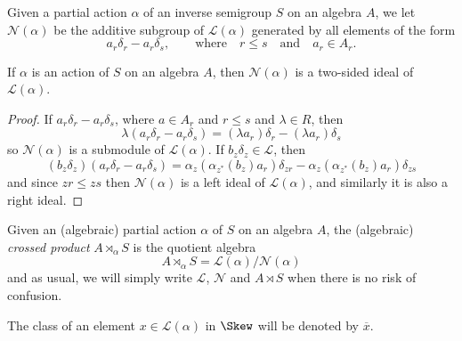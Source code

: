 \begin{definition}\label{definitionNalpha}
Given a partial action $\alpha$ of an inverse semigroup $S$ on an algebra $A$, we let $\mathscr{N}(\alpha)$ be the additive subgroup of $\mathscr{L}(\alpha)$ generated by all elements of the form
\[a_r\delta_r - a_r\delta_s,\qquad\text{where}\quad r\leq s\quad\text{and}\quad a_r\in A_r.\] 
\end{definition}

\begin{proposition}
If $\alpha$ is an action of $S$ on an algebra $A$, then $\mathscr{N}(\alpha)$ is a two-sided ideal of $\mathscr{L}(\alpha)$.
\end{proposition}
\begin{proof}
If $a_r\delta_r-a_r\delta_s$, where $a\in A_r$ and $r\leq s$ and $\lambda\in R$, then
\[\lambda(a_r\delta_r-a_r\delta_s)=(\lambda a_r)\delta_r-(\lambda a_r)\delta_s\]
so $\mathscr{N}(\alpha)$ is a submodule of $\mathscr{L}(\alpha)$. If $b_z\delta_z\in\mathscr{L}$, then
\[(b_z\delta_z)(a_r\delta_r-a_r\delta_s)=\alpha_z(\alpha_{z^*}(b_z)a_r)\delta_{zr}-\alpha_z(\alpha_{z^*}(b_z)a_r)\delta_{zs}\]
and since $zr\leq zs$ then $\mathscr{N}(\alpha)$ is a left ideal of $\mathscr{L}(\alpha)$, and similarly it is also a right ideal.\qedhere
\end{proof}

\begin{definition}\label{definitioncrossedproduct}
Given an (algebraic) partial action $\alpha$ of $S$ on an algebra $A$, the (algebraic) \emph{crossed product} $A\rtimes_\alpha S$ is the quotient algebra
\[A\rtimes_\alpha S=\mathscr{L}(\alpha)/\mathscr{N}(\alpha)\]
and as usual, we will simply write $\mathscr{L}$, $\mathscr{N}$ and $A\rtimes S$ when there is no risk of confusion.%

The class of an element $x\in\mathscr{L}(\alpha)$ in $\Skew$ will be denoted by $\overline{x}$.
\end{definition}

